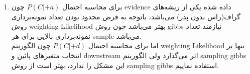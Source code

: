 \begin{enumerate} [label=(\alph*)]
	\item
	
	برای محاسبه احتمال $P(C| + a)$ چون evidence داده شده یکی از ریشه‌های گراف(راس بدون پدر) می‌باشد، باتوجه به فرض محدود بودن تعداد نمونه‌برداری روش weighting Likelihood بهتر می‌باشد چون روش gibbs نیازمند تعداد نمونه‌برداری بالایی برای هر sample می‌باشد.\\
	اما برای محاسبه احتمال $P(C| + d)$ چون الگوریتم weighting Likelihood تنها بر انتخاب متغیرهای پائین و downstream اثر می‌گذارد ولی الگوریتم sampling gibbs این مشکل را ندارد،‌ بهتر است از روش sampling gibbs استفاده نماییم.
	
\end{enumerate}